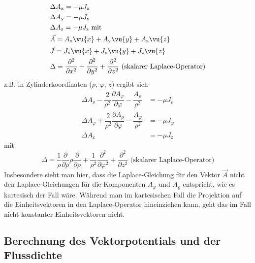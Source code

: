 			        \begin{equation}\begin{split}
					        & \Delta  A _\mathrm{x} = -\mu  J_\mathrm{x}\\
					        & \Delta  A _\mathrm{y} = -\mu  J_\mathrm{y}\\
					        & \Delta  A _\mathrm{z} = -\mu  J_\mathrm{z} \text{ mit} \\
					        &  \vec{A} =  A _\mathrm{x}  \vu{x} +  A _\mathrm{y}  \vu{y} +  A _\mathrm{z}  \vu{z}\\
					        & \vec{J} = J_\mathrm{x}  \vu{x} + J_\mathrm{y}  \vu{y} + J_\mathrm{z}  \vu{z} \\
					        &\Delta = \dfrac{\partial^2}{\partial x^2} + \dfrac{\partial^2}{\partial y^2} + \dfrac{\partial^2}{\partial z^2} \text{ (skalarer Laplace-Operator)}
				        \end{split}\end{equation}
			   z.B. in Zylinderkoordinaten (\(\rho,\,\varphi,\,z \)) ergibt sich
			        \begin{equation}\begin{split}
					        \Delta  A _{\rho} - \dfrac{2}{\rho^2} \dfrac{\partial  A _{\varphi}}{\partial \varphi} - \dfrac{ A _{\rho}}{\rho^2} &= -\mu J_{\rho} \\
					        \Delta  A _{\varphi} + \dfrac{2}{\rho^2}  \dfrac{\partial  A _{\rho}}{\partial \varphi} - \dfrac{ A _{\varphi}}{\rho^2} &= -\mu J_{\varphi} \\
					        \Delta  A _\mathrm{z} &= -\mu  J_\mathrm{z}
				        \end{split}\end{equation}
			        mit
			        \begin{equation}
				        \Delta = \dfrac{1}{\rho} \dfrac{\partial}{\partial \rho} \rho \dfrac{\partial}{\partial \rho} + \dfrac{1}{\rho^2} \dfrac{\partial^2}{\partial \varphi^2} + \dfrac{\partial^2}{\partial z^2} \text{ (skalarer Laplace-Operator)}
			        \end{equation}
			        Insbesondere sieht man hier, dass die Laplace-Gleichung für den Vektor $\vec{A}$ nicht den Laplace-Gleichungen für die Komponenten $A_\varphi$ und $A_\varrho$ entspricht, wie es kartesisch der Fall wäre. Während man im kartesischen Fall die Projektion auf die Einheitsvektoren in den Laplace-Operator hineinziehen kann, geht das im Fall nicht konstanter Einheitsvektoren nicht.
  \subsection{Berechnung des Vektorpotentials und der Flussdichte}
